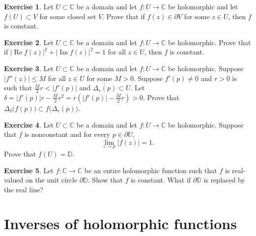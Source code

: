 \documentclass[12pt,openany]{book}
\renewcommand{\Re}{\operatorname{Re}}
\renewcommand{\Im}{\operatorname{Im}}
\newcommand{\abs}[1]{\left\lvert {#1} \right\rvert}
\newcommand{\C}{{\mathbb{C}}}
\newcommand{\D}{{\mathbb{D}}}
\theoremstyle{plain}
\theoremstyle{remark}
\theoremstyle{definition}
\newenvironment{exbox}{%
    \def\FrameCommand{\vrule width 1pt \relax\hspace {10pt}}%
    \MakeFramed {\advance \hsize -\width \FrameRestore }%
}{%
    \endMakeFramed
}
\theoremstyle{exercise}
\newtheorem{exercise}{Exercise}[section]
\theoremstyle{example}
\begin{document}
\begin{exbox}
\begin{exercise}
Let $U \subset \C$ be a domain and let $f \colon U \to \C$ be holomorphic
and let $f(U) \subset V$ for some closed set $V$.
Prove that if $f(z) \in \partial V$
for some $z \in U$, then $f$ is constant.
\end{exercise}

\begin{exercise}
Let $U \subset \C$ be a domain and let $f \colon U \to \C$ be holomorphic.
Prove that if $\abs{\Re f(z)}^2 + \abs{\Im f(z)}^2 = 1$ for all $z \in U$,
then $f$ is constant.
\end{exercise}

\begin{exercise}
Let $U \subset \C$ be a domain and let $f \colon U \to \C$ be holomorphic.
Suppose $\abs{f''(z)} \leq M$ for all $z \in U$ for some $M > 0$.
Suppose $f'(p) \not= 0$ and $r > 0$ is such that
$\frac{M}{2}r < \abs{f'(p)}$ and $\overline{\Delta_r(p)} \subset U$.
Let $\delta = \abs{f'(p)}r - \frac{M}{2} r^2
= r\left(\abs{f'(p)} - \frac{M}{2} r\right) > 0$.  Prove that
$\Delta_{\delta}\bigl(f(p)\bigr) \subset f\bigl( \Delta_r(p) \bigr)$.
\end{exercise}

\begin{exercise}
Let $U \subset \C$ be a domain and let $f \colon U \to \C$ be holomorphic.
Suppose that $f$ is nonconstant and for every $p \in \partial U$,
\begin{equation*}
\lim_{z \to p} \abs{f(z)}=1 .
\end{equation*}
Prove that $f(U) = \D$.
\end{exercise}

\begin{exercise}
Let $f \colon \C \to \C$ be an entire holomorphic function such that
$f$ is real-valued on the unit circle $\partial \D$.  Show that $f$ is
constant.  What if $\partial \D$ is replaced by the real line?
\end{exercise}
\end{exbox}




\section{Inverses of holomorphic functions} \label{sec:inverses}
\end{document}

